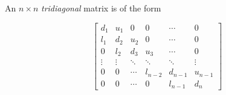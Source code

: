 \documentclass{article}
\begin{document}
An $n \times n$ \emph{tridiagonal} matrix is of the form

$$ \begin{bmatrix}
d_1 & u_1 & 0 & 0 & \cdots & 0 \\ 
l_1 & d_2 & u_2 & 0 & \cdots & 0 \\
 0  & l_2 & d_3 & u_3 & \cdots & 0 \\
\vdots & \vdots & \ddots & \ddots & \ddots & \vdots \\ 
 0  & 0 & \cdots &  l_{n-2} & d_{n-1} & u_{n-1} \\ 
 0  & 0 & \cdots & 0 & l_{n-1} & d_{n}
\end{bmatrix} $$
\end{document}
